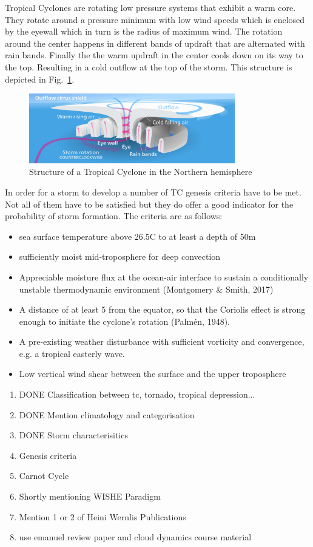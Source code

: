 Tropical Cyclones are rotating low pressure systems that exhibit a warm core. They rotate around a pressure minimum with low wind speeds which is enclosed by the eyewall which in turn is the radius of maximum wind. The rotation around the center happens in different bands of updraft that are alternated with rain bands. Finally the the warm updraft in the center cools down on its way to the top. Resulting in a cold outflow at the top of the storm. This structure is depicted in Fig.~\ref{fig:tc-structure}.
\begin{figure}[ht]
\centering
\includegraphics[width=0.8\textwidth]{img/hurricane-structure.png}
\caption{Structure of a Tropical Cyclone in the Northern hemisphere~\cite{hurricane-structure}}
\label{fig:tc-structure}
\end{figure}
In order for a storm to develop a number of TC genesis criteria have to be met. Not all of them have to be satisfied but they do offer a good indicator for the probability of storm formation.
The criteria are as follows:
\begin{itemize}
\item sea surface temperature above 26.5\degree C to at least a depth of 50m
\item sufficiently moist mid-troposphere for deep convection
\item Appreciable moisture flux at the ocean-air interface to sustain a conditionally unstable thermodynamic environment (Montgomery \& Smith, 2017)
\item A distance of at least 5 from the equator, so that the Coriolis effect is strong enough to initiate the cyclone's rotation (Palm\'{e}n, 1948).
\item A pre-existing weather disturbance with sufficient vorticity and convergence, e.g. a tropical easterly wave.
\item Low vertical wind shear between the surface and the upper troposphere
\end{itemize}

\begin{enumerate}
\item DONE Classification between tc, tornado, tropical depression...
\item DONE Mention climatology and categorisation
\item DONE Storm characterisitics
\item Genesis criteria
\item Carnot Cycle
\item Shortly mentioning WISHE Paradigm
\item Mention 1 or 2 of Heini Wernlis Publications
\item use emanuel review paper and cloud dynamics course material
\end{enumerate}


